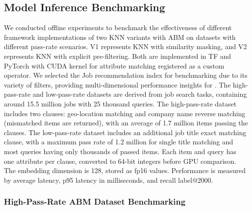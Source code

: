 \subsection{Model Inference Benchmarking}\label{sec:model_benchmark}
We conducted offline experiments to benchmark the effectiveness of different framework implementations of two KNN variants with ABM on datasets with different pass-rate scenarios. V1 represents KNN with similarity masking, and V2 represents KNN with explicit pre-filtering. Both are implemented in TF and PyTorch with CUDA kernel for attribute matching registered as a custom operator. 
We selected the Job recommendation index for benchmarking due to its variety of filters, providing multi-dimensional performance insights for {\systemname}. The high-pass-rate and low-pass-rate datasets are derived from job search tasks, containing around 15.5 million jobs with 25 thousand queries. The high-pass-rate dataset includes two clauses: geo-location matching and company name reverse matching (mismatched items are returned), with an average of 1.7 million items passing the clauses. The low-pass-rate dataset includes an additional job title exact matching clause, with a maximum pass rate of 1.2 million for single title matching and most queries having only thousands of passed items. Each item and query has one attribute per clause, converted to 64-bit integers before GPU comparison. The embedding dimension is 128, stored as fp16 values. Performance is measured by average latency, p95 latency in milliseconds, and recall label@2000.

\subsubsection{High-Pass-Rate ABM Dataset Benchmarking}\label{sec:high-pass}


